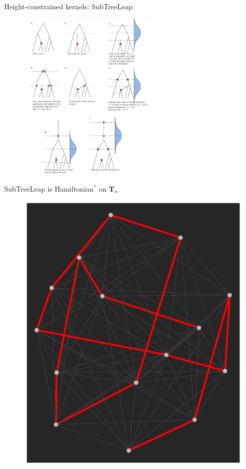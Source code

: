 \documentclass[newPxFont,numfooter,sectionpages]{beamer}
\begin{document}
\begin{frame}{Height-constrained kernels: SubTreeLeap}
\begin{figure}
	\includegraphics[width=\textwidth,height=8cm]{figures/STL_kernel.pdf} 
\end{figure}
\end{frame}

\begin{frame}{SubTreeLeap is Hamiltonian$^\ast$ on $\boldsymbol T_n$ }
\begin{figure}
	\includegraphics[scale=0.35]{figures/hamiltonian_SPR_4taxa.pdf} 
\end{figure}

\end{frame}
\end{document}
